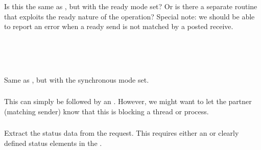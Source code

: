 \documentclass{article}
\begin{document}
\subsubsection{}
Is this the same as , but with the ready mode set?  Or is
there a separate routine that exploits the ready nature of the operation?
Special note: we should be able to report an error when a ready send is not
matched by a posted receive.
\subsubsection{}
\begin{adi3}
\begin{mmadi}\\
\\
\begin{core}
\end{core}
\end{mmadi}
\end{adi3}
\subsubsection{}
Same as , but with the synchronous mode set.

\subsubsection{}
This can simply be  followed by an .  However,
we might want to let the partner (matching sender) know that this is blocking
a thread or process.  

\subsubsection{}
\begin{adi3}
\begin{mmadi}
\begin{core}
\end{core}
\end{mmadi}
\end{adi3}

\subsubsection{}
Extract the status data from the request.
This requires either an  or clearly defined
status elements in the .
\end{document}
